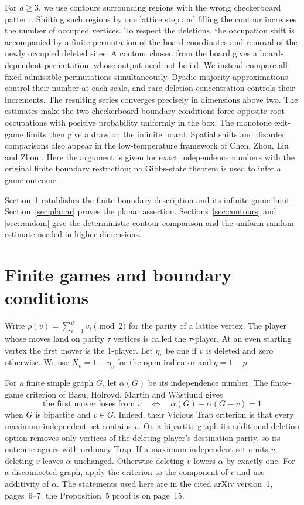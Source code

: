 \documentclass[11pt,a4paper]{article}
\numberwithin{equation}{section}
\begin{document}
For $d\ge3$, we use contours surrounding regions with the wrong
checkerboard pattern. Shifting such regions by one lattice step and
filling the contour increases the number of occupied vertices.
To respect the deletions, the occupation shift is accompanied by a
finite permutation of the board coordinates and removal of the newly
occupied deleted sites. A contour chosen from the board gives a
board-dependent permutation, whose output need not be iid.
We instead compare all fixed admissible permutations simultaneously.
Dyadic majority approximations control their number at each scale,
and rare-deletion concentration controls their increments. The
resulting series converges precisely in dimensions above two.
The estimates make the two checkerboard boundary conditions force
opposite root occupations with positive probability uniformly in the box.
The monotone exit-game limits then give a draw on the infinite board.
Spatial shifts and disorder comparisons also appear in the
low-temperature framework of Chen, Zhou, Liu and Zhou \cite{CZLZ}.
Here the argument is given for exact independence numbers with the
original finite boundary restriction; no Gibbs-state theorem is used
to infer a game outcome.

Section~\ref{sec:games} establishes the finite boundary description
and its infinite-game limit. Section~\ref{sec:planar} proves the planar
assertion. Sections~\ref{sec:contours} and \ref{sec:random} give the
deterministic contour comparison and the uniform random estimate
needed in higher dimensions.

\section{Finite games and boundary conditions}\label{sec:games}
Write $\rho(v)=\sum_{i=1}^d v_i\pmod 2$ for the parity of a lattice vertex.
The player whose moves land on parity $\tau$ vertices is called the
$\tau$-player. At an even starting vertex the first mover is the $1$-player.
Let $\eta_v$ be one if $v$ is deleted and zero otherwise.
We use $X_v=1-\eta_v$ for the open indicator and $q=1-p$.

For a finite simple graph $G$, let $\alpha(G)$ be its independence number.
The finite-game criterion of Basu, Holroyd, Martin and W\"astlund
\cite[Proposition~5 and the following bipartite equivalence]{BHMW} gives
\begin{equation}\label{eq:finite-criterion}
 \text{the first mover loses from }v
 \quad\Longleftrightarrow\quad
 \alpha(G)-\alpha(G-v)=1
\end{equation}
when $G$ is bipartite and $v\in G$.
Indeed, their Vicious Trap criterion is that every maximum independent set
contains $v$. On a bipartite graph its additional deletion option removes
only vertices of the deleting player's destination parity, so its outcome
agrees with ordinary Trap. If a maximum independent set omits $v$, deleting
$v$ leaves $\alpha$ unchanged. Otherwise deleting $v$ lowers $\alpha$ by
exactly one. For a disconnected graph, apply the criterion to the component
of $v$ and use additivity of $\alpha$.
The statements used here are in the cited arXiv version~1,
pages~6--7; the Proposition~5 proof is on page~15.
\end{document}
